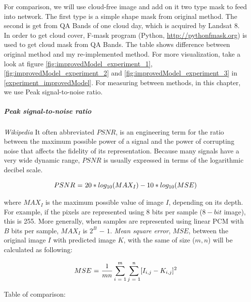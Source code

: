 For comparison, we will use cloud-free image and add on it two type mask to feed into network. The first type is a simple shape mask from original method. The second is get from QA Bands of one cloud day, which is acquired by Landsat 8. In order to get cloud cover, F-mask program (Python, \href{http://pythonfmask.org}{http://pythonfmask.org}) is used to get cloud mask from QA Bands. The table shows difference between original method and my re-implemented method. For more visualization, take a look at figure \ref{fig:improvedModel_experiment_1}, \ref{fig:improvedModel_experiment_2} and \ref{fig:improvedModel_experiment_3} in \ref{experiment_improvedModel}. For measuring between methods, in this chapter, we use Peak signal-to-noise ratio.

\subparagraph{Peak signal-to-noise ratio} \textit{Wikipedia} It often abbreviated $PSNR$, is an engineering term for the ratio between the maximum possible power of a signal and the power of corrupting noise that affects the fidelity of its representation. Because many signals have a very wide dynamic range, $PSNR$ is usually expressed in terms of the logarithmic decibel scale. 

\begin{equation}
\label{psnr_eq}
\centering
PSNR \textrm{ = } 20 * log_{10}(MAX_I) - 10 * log_{10}(MSE)
\end{equation}

where $MAX_I$ is the maximum possible value of image $I$, depending on its depth. For example, if the pixels are represented using 8 bits per sample ($8-bit$ image), this is 255. More generally, when samples are represented using linear PCM with $B$ bits per sample, $MAX_I$ is $2^B$ $-$ $1$. \textit{Mean square error}, $MSE$, between the original image $I$ with predicted image $K$, with the same of size ($m, n$) will be calculated as following:

\begin{equation}
\centering
MSE \textrm{ = } \frac{1}{mn} \sum_{i \textrm{ = } 1}^{m} \sum_{j \textrm{ = } 1}^{n} [I_{i,j} - K_{i,j}]^2
\end{equation}

\vspace{0.3cm}
Table of comparison:

